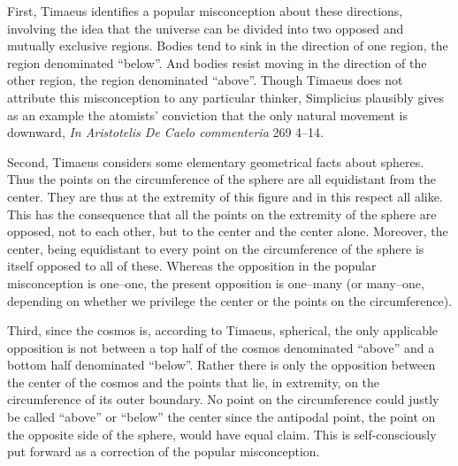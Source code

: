 First, Timaeus identifies a popular misconception about these directions, involving the idea that the universe can be divided into two opposed and mutually exclusive regions. Bodies tend to sink in the direction of one region, the region denominated ``below''. And bodies resist moving in the direction of the other region, the region denominated ``above''. Though Timaeus does not attribute this misconception to any particular thinker, Simplicius plausibly gives as an example the atomists' conviction that the only natural movement is downward, \emph{In Aristotelis De Caelo commenteria} 269 4--14.

Second, Timaeus considers some elementary geometrical facts about spheres. Thus the points on the circumference of the sphere are all equidistant from the center. They are thus at the extremity of this figure and in this respect all alike. This has the consequence that all the points on the extremity of the sphere are opposed, not to each other, but to the center and the center alone. Moreover, the center, being equidistant to every point on the circumference of the sphere is itself opposed to all of these. Whereas the opposition in the popular misconception is one--one, the present opposition is one--many (or many--one, depending on whether we privilege the center or the points on the circumference).

Third, since the cosmos is, according to Timaeus, spherical, the only applicable opposition is not between a top half of the cosmos denominated ``above'' and a bottom half denominated ``below''. Rather there is only the opposition between the center of the cosmos and the points that lie, in extremity, on the circumference of its outer boundary. No point on the circumference could justly be called ``above'' or ``below'' the center since the antipodal point, the point on the opposite side of the sphere, would have equal claim. This is self-consciously put forward as a correction of the popular misconception.

